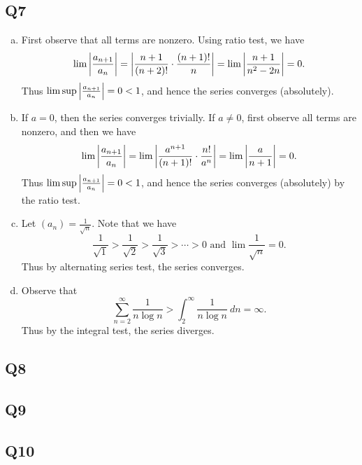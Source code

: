 \documentclass[12pt,lettersize]{article}
\begin{document}
	\subsection*{Q7}
	\begin{enumerate}[(a)]
		\item First observe that all terms are nonzero. Using ratio test, we have
		\begin{displaymath}
			\lim\abs{\frac{a_{n+1}}{a_n}}=\abs{\frac{n+1}{(n+2)!}\cdot\frac{(n+1)!}{n}}=\lim\abs{\frac{n+1}{n^2-2n}}=0.
		\end{displaymath}
		Thus $\lim\sup\abs{\frac{a_{n+1}}{a_n}}=0<1$, and hence the series converges (absolutely). 
		\item If $a=0$, then the series converges trivially. If $a\neq 0$, first observe all terms are nonzero, and then we have
		\begin{displaymath}
			\lim\abs{\frac{a_{n+1}}{a_n}}=\lim\abs{\frac{a^{n+1}}{(n+1)!}\cdot\frac{n!}{a^n}}=\lim\abs{\frac{a}{n+1}}=0.
		\end{displaymath}
		Thus $\lim\sup\abs{\frac{a_{n+1}}{a_n}}=0<1$, and hence the series converges (absolutely) by the ratio test.
		\item Let $(a_n)=\frac{1}{\sqrt{n}}$. Note that we have
		\begin{displaymath}
			\frac{1}{\sqrt{1}}>\frac{1}{\sqrt{2}}>\frac{1}{\sqrt{3}}>\cdots>0\text{ and }\lim\frac{1}{\sqrt{n}}=0.
		\end{displaymath}
		Thus by alternating series test, the series converges.
		\item Observe that
		\begin{displaymath}
			\sum_{n=2}^{\infty}\frac{1}{n\log n}>\int_{2}^{\infty}\frac{1}{n\log n}\ dn=\infty.
		\end{displaymath}
		Thus by the integral test, the series diverges.
	
			
	\end{enumerate}
	\newpage
	
	\subsection*{Q8}

	\newpage
	
	\subsection*{Q9}
	
	\newpage
	
	\subsection*{Q10}
	
	\newpage
	
\end{document}
